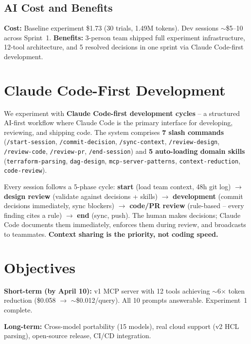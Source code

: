 \documentclass[10pt,twocolumn]{article}
\begin{document}
\subsection{AI Cost and Benefits}

\textbf{Cost:} Baseline experiment \$1.73 (30 trials, 1.49M tokens). Dev sessions $\sim$\$5--10 across Sprint~1. \textbf{Benefits:} 3-person team shipped full experiment infrastructure, 12-tool architecture, and 5 resolved decisions in one sprint via Claude Code-first development.

\section{Claude Code-First Development}

We experiment with \textbf{Claude Code-first development cycles} -- a structured AI-first workflow where Claude Code is the primary interface for developing, reviewing, and shipping code. The system comprises \textbf{7 slash commands} (\texttt{/start-session}, \texttt{/commit-decision}, \texttt{/sync-context}, \texttt{/review-design}, \texttt{/review-code}, \texttt{/review-pr}, \texttt{/end-session}) and \textbf{5 auto-loading domain skills} (\texttt{terraform-parsing}, \texttt{dag-design}, \texttt{mcp-server-patterns}, \texttt{context-reduction}, \texttt{code-review}).

Every session follows a 5-phase cycle: \textbf{start} (load team context, 48h git log) $\to$ \textbf{design review} (validate against decisions + skills) $\to$ \textbf{development} (commit decisions immediately, sync blockers) $\to$ \textbf{code/PR review} (rule-based -- every finding cites a rule) $\to$ \textbf{end} (sync, push). The human makes decisions; Claude Code documents them immediately, enforces them during review, and broadcasts to teammates. \textbf{Context sharing is the priority, not coding speed.}

\section{Objectives}

\textbf{Short-term (by April 10):} v1 MCP server with 12 tools achieving $\sim$6$\times$ token reduction (\$0.058 $\to$ $\sim$\$0.012/query). All 10 prompts answerable. Experiment~1 complete.

\textbf{Long-term:} Cross-model portability (15 models), real cloud support (v2 HCL parsing), open-source release, CI/CD integration.
\end{document}
